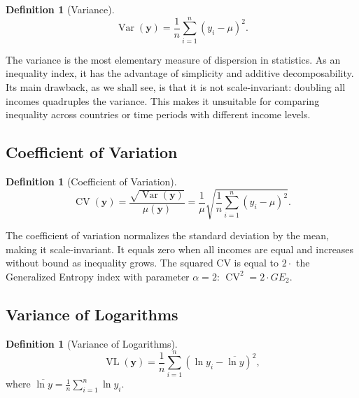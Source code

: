 \documentclass[12pt]{article}
\theoremstyle{plain}
\theoremstyle{definition}
\newtheorem{definition}[theorem]{Definition}
\theoremstyle{remark}
\newcommand{\bfy}{\mathbf{y}}
\begin{document}
\begin{definition}[Variance]
\begin{equation}\label{eq:var}
\operatorname{Var}(\bfy) = \frac{1}{n} \sum_{i=1}^n (y_i - \mu)^2.
\end{equation}
\end{definition}

The variance is the most elementary measure of dispersion in statistics.
As an inequality index, it has the advantage of simplicity and additive decomposability.
Its main drawback, as we shall see, is that it is not scale-invariant: doubling all incomes quadruples the variance.
This makes it unsuitable for comparing inequality across countries or time periods with different income levels.

\subsection{Coefficient of Variation}\label{sec:cv}

\begin{definition}[Coefficient of Variation]
\begin{equation}\label{eq:cv}
\operatorname{CV}(\bfy) = \frac{\sqrt{\operatorname{Var}(\bfy)}}{\mu(\bfy)} = \frac{1}{\mu}\sqrt{\frac{1}{n}\sum_{i=1}^n (y_i - \mu)^2}.
\end{equation}
\end{definition}

The coefficient of variation normalizes the standard deviation by the mean, making it scale-invariant.
It equals zero when all incomes are equal and increases without bound as inequality grows.
The squared CV is equal to $2 \cdot$ the Generalized Entropy index with parameter $\alpha = 2$: $\operatorname{CV}^2 = 2 \cdot GE_2$.

\subsection{Variance of Logarithms}\label{sec:vl}

\begin{definition}[Variance of Logarithms]
\begin{equation}\label{eq:vl}
\operatorname{VL}(\bfy) = \frac{1}{n} \sum_{i=1}^n \left(\ln y_i - \overline{\ln y}\right)^2,
\end{equation}
where $\overline{\ln y} = \frac{1}{n}\sum_{i=1}^n \ln y_i$.
\end{definition}
\end{document}
